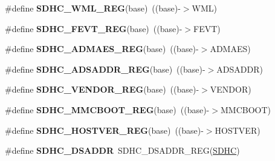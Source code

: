 \begin{DoxyCompactItemize}
\item 
\#define {\bfseries S\+D\+H\+C\+\_\+\+W\+M\+L\+\_\+\+R\+EG}(base)~((base)-\/$>$W\+ML)\hypertarget{group__SDHC__Register__Accessor__Macros_ga47fdba7435ca80ea78e3b4f40c93f47a}{}\label{group__SDHC__Register__Accessor__Macros_ga47fdba7435ca80ea78e3b4f40c93f47a}

\item 
\#define {\bfseries S\+D\+H\+C\+\_\+\+F\+E\+V\+T\+\_\+\+R\+EG}(base)~((base)-\/$>$F\+E\+VT)\hypertarget{group__SDHC__Register__Accessor__Macros_gaadc28a18096ddb50bff7f7b954728d05}{}\label{group__SDHC__Register__Accessor__Macros_gaadc28a18096ddb50bff7f7b954728d05}

\item 
\#define {\bfseries S\+D\+H\+C\+\_\+\+A\+D\+M\+A\+E\+S\+\_\+\+R\+EG}(base)~((base)-\/$>$A\+D\+M\+A\+ES)\hypertarget{group__SDHC__Register__Accessor__Macros_ga51bd53d6e7c47390748b6b15f69a6769}{}\label{group__SDHC__Register__Accessor__Macros_ga51bd53d6e7c47390748b6b15f69a6769}

\item 
\#define {\bfseries S\+D\+H\+C\+\_\+\+A\+D\+S\+A\+D\+D\+R\+\_\+\+R\+EG}(base)~((base)-\/$>$A\+D\+S\+A\+D\+DR)\hypertarget{group__SDHC__Register__Accessor__Macros_ga9432cad10f3bb51cb42e60bd2731a750}{}\label{group__SDHC__Register__Accessor__Macros_ga9432cad10f3bb51cb42e60bd2731a750}

\item 
\#define {\bfseries S\+D\+H\+C\+\_\+\+V\+E\+N\+D\+O\+R\+\_\+\+R\+EG}(base)~((base)-\/$>$V\+E\+N\+D\+OR)\hypertarget{group__SDHC__Register__Accessor__Macros_gacf1f267f49fec9d5b600c95b7623c421}{}\label{group__SDHC__Register__Accessor__Macros_gacf1f267f49fec9d5b600c95b7623c421}

\item 
\#define {\bfseries S\+D\+H\+C\+\_\+\+M\+M\+C\+B\+O\+O\+T\+\_\+\+R\+EG}(base)~((base)-\/$>$M\+M\+C\+B\+O\+OT)\hypertarget{group__SDHC__Register__Accessor__Macros_ga044d263f52b86072ee45b70deb16bfbb}{}\label{group__SDHC__Register__Accessor__Macros_ga044d263f52b86072ee45b70deb16bfbb}

\item 
\#define {\bfseries S\+D\+H\+C\+\_\+\+H\+O\+S\+T\+V\+E\+R\+\_\+\+R\+EG}(base)~((base)-\/$>$H\+O\+S\+T\+V\+ER)\hypertarget{group__SDHC__Register__Accessor__Macros_gad11dcba8920d90c88672b522199da534}{}\label{group__SDHC__Register__Accessor__Macros_gad11dcba8920d90c88672b522199da534}

\item 
\#define {\bfseries S\+D\+H\+C\+\_\+\+D\+S\+A\+D\+DR}~S\+D\+H\+C\+\_\+\+D\+S\+A\+D\+D\+R\+\_\+\+R\+EG(\hyperlink{group__SDHC__Peripheral__Access__Layer_gadfa975565f8f38eb596ca3ed92df30c8}{S\+D\+HC})\hypertarget{group__SDHC__Register__Accessor__Macros_ga49ef29273fdcfe72894e1c09705d03e1}{}\label{group__SDHC__Register__Accessor__Macros_ga49ef29273fdcfe72894e1c09705d03e1}


\end{DoxyCompactItemize}

